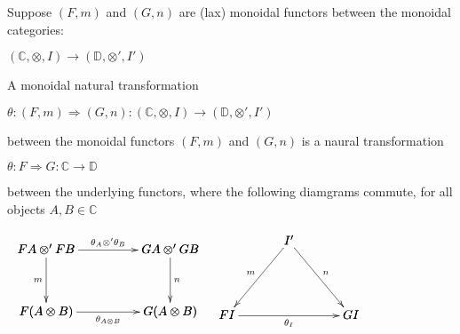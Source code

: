 \begin{definition}
\label{def:monoidal_natural_transformation}
Suppose $(F,m)$ and $(G,n)$ are (lax) monoidal functors between the monoidal categories:
\begin{center}
    \begin{math}
        (\mathbb{C}, \otimes, I) \rightarrow (\mathbb{D}, \otimes ', I')
    \end{math}
\end{center}
A monoidal natural transformation
\begin{center}
    \begin{math}
        \theta : (F,m) \Rightarrow (G,n) : (\mathbb{C}, \otimes, I) \rightarrow (\mathbb{D}, \otimes ', I')
    \end{math}
\end{center}
between the monoidal functors $(F,m)$ and $(G,n)$ is a naural transformation
\begin{center}
    \begin{math}
        \theta : F \Rightarrow G : \mathbb{C} \rightarrow \mathbb{D}
    \end{math}
\end{center}
between the underlying functors, where the following diamgrams commute, for all objects $A,B \in \mathbb{C}$
\begin{center}
    \begin{math}
        \begin{array}{lr}
            \bfig
                \square|alrb|<1000,500>[
                    FA \otimes ' FB`
                    GA \otimes ' GB`
                    F(A \otimes B)`
                    G(A \otimes B);
                    \theta_A \otimes ' \theta_B`
                    m`
                    n`
                    \theta_{A \otimes B}
                ]
            \efig
            &
            \bfig
                \Atriangle<500,600>[
                    I'`
                    FI`
                    GI;
                    m`
                    n`
                    \theta_I
                ]
            \efig
        \end{array}
    \end{math}
\end{center}
\cite{mellies2009}
\end{definition}


